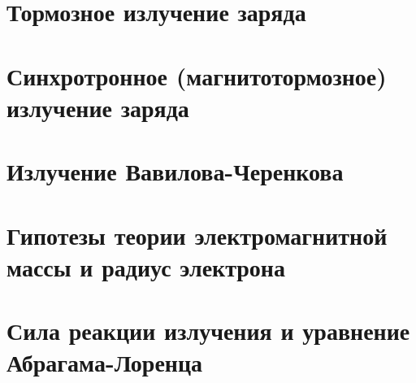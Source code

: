 \begin{multicols*}{2}
		\section{Тормозное излучение заряда}
		
		\section{Синхротронное (магнитотормозное) излучение заряда}
		
		\section{Излучение Вавилова-Черенкова}
		
		\section{Гипотезы теории электромагнитной массы и радиус электрона}
		
		\section{Сила реакции излучения и уравнение Абрагама-Лоренца}
		
	\end{multicols*}
